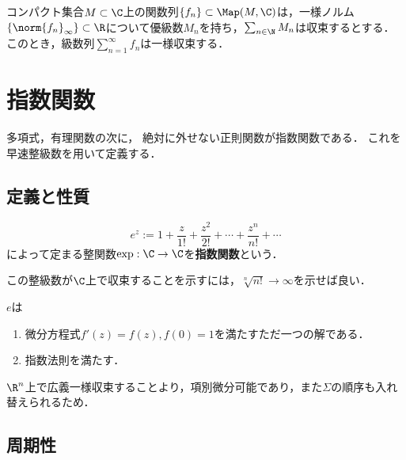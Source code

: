 \documentclass[uplatex, dvipdfmx]{jsreport}
\begin{document}
\begin{proposition}
    コンパクト集合$M\subset\C$上の関数列$\{f_n\}\subset\Map(M,\C)$は，一様ノルム$\{\norm{f_n}_\infty\}\subset\R$について優級数$M_n$を持ち，$\sum_{n\in\N}M_n$は収束するとする．
    このとき，級数列$\sum_{n=1}^\infty f_n$は一様収束する．
\end{proposition}

\section{指数関数}

\begin{tcolorbox}[colframe=ForestGreen, colback=ForestGreen!10!white,breakable,colbacktitle=ForestGreen!40!white,coltitle=black,fonttitle=\bfseries\sffamily,
title=]
    多項式，有理関数の次に，
    絶対に外せない正則関数が指数関数である．
    これを早速整級数を用いて定義する．
\end{tcolorbox}

\subsection{定義と性質}

\begin{definition}
    \[e^z:=1+\frac{z}{1!}+\frac{z^2}{2!}+\cdots+\frac{z^n}{n!}+\cdots\]
    によって定まる整関数$\exp:\C\to\C$を\textbf{指数関数}という．
\end{definition}
\begin{Proof}
    この整級数が$\C$上で収束することを示すには，$\sqrt[n]{n!}\to\infty$を示せば良い．
\end{Proof}

\begin{lemma}
    $e$は
    \begin{enumerate}
        \item 微分方程式$f'(z)=f(z),f(0)=1$を満たすただ一つの解である．
        \item 指数法則を満たす．
    \end{enumerate}
\end{lemma}
\begin{Proof}
    $\R^n$上で広義一様収束することより，項別微分可能であり，また$\Sigma$の順序も入れ替えられるため．
\end{Proof}

\subsection{周期性}
\end{document}
